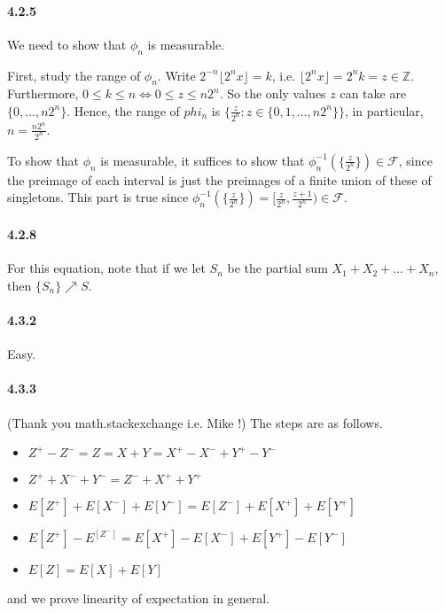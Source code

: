 \documentclass[a4paper]{article}
\newcommand{\alg}[0]{\mathcal{F}} %
\newcommand{\integer}[0]{\mathbb{Z}} %
\newcommand{\seqconn}[3]{#1_1 #3 #1_2 #3 \dots #3 #1_{#2}} %
\newcommand{\floor}[1]{\lfloor #1\rfloor}
\begin{document}
\paragraph{4.2.5} We need to show that $\phi_n$ is measurable.

First, study the range of $\phi_n$. Write $2^{-n}\floor{2^nx} = k$, i.e. $\floor{2^nx} = 2^nk = z\in\integer$. Furthermore, $0\leq k\leq n\iff 0\leq z\leq n2^n$. So the only values $z$ can take are $\{0,\dots,n2^n\}$. Hence, the range of $phi_n$ is $\{\frac{z}{2^n} : z\in \{0,1,\dots,n2^n\}\}$, in particular, $n = \frac{n2^n}{2^n}$.

To show that $\phi_n$ is measurable, it suffices to show that $\phi_n^{-1}(\{\frac{z}{2^n}\})\in \alg$, since the preimage of each interval is just the preimages of a finite union of these of singletons. This part is true since $\phi_n^{-1}(\{\frac{z}{2^n}\}) = [\frac{z}{2^n}, \frac{z+1}{2^n})\in \alg$.


\paragraph{4.2.8} For this equation, note that if we let $S_n$ be the partial sum $\seqconn{X}{n}{+}$, then $\{S_n\}\nearrow S$.

\paragraph{4.3.2} Easy.

\paragraph{4.3.3} (Thank you math.stackexchange i.e. Mike !)
The steps are as follows.
\begin{itemize}
	\item $Z^+ - Z^- = Z = X + Y = X^+ - X^- + Y^+ - Y^-$
	\item $Z^+ + X^- + Y^- = Z^- + X^+ + Y^+$
	\item $E[Z^+] + E[X^-] + E[Y^-] = E[Z^-] + E[X^+] + E[Y^+]$
	\item $E[Z^+] - E^[Z^-] = E[X^+] - E[X^-] + E[Y^+] - E[Y^-]$
	\item $E[Z] = E[X] + E[Y]$
\end{itemize}
and we prove linearity of expectation in general.
\end{document}
